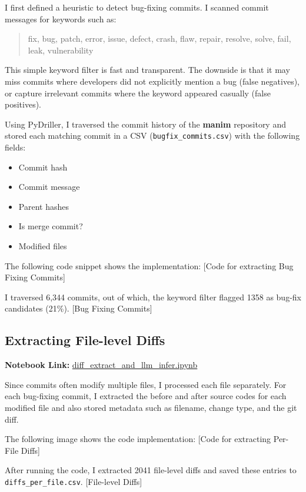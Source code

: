\documentclass[10pt,a4paper]{report}
\begin{document}
I first defined a heuristic to detect bug-fixing commits. I scanned commit messages for keywords such as:
\begin{quote}
fix, bug, patch, error, issue, defect, crash, flaw, repair, resolve, solve, fail, leak, vulnerability
\end{quote}

This simple keyword filter is fast and transparent. The downside is that it may miss commits where developers did not explicitly mention a bug (false negatives), or capture irrelevant commits where the keyword appeared casually (false positives).

Using PyDriller, I traversed the commit history of the \textbf{manim} repository and stored each matching commit in a CSV (\texttt{bugfix\_commits.csv}) with the following fields:
\begin{itemize}[itemsep=0.05em, topsep=0pt]
    \item Commit hash
    \item Commit message
    \item Parent hashes
    \item Is merge commit?
    \item Modified files
\end{itemize}

The following code snippet shows the implementation:
[Code for extracting Bug Fixing Commits]

I traversed 6,344 commits, out of which, the keyword filter flagged 1358 as bug-fix candidates (21\%).
[Bug Fixing Commits]

\subsection{Extracting File-level Diffs}
\textbf{Notebook Link:} \href{https://github.com/ShardulJunagade/cs202-stt/lab2/diff_extract_and_llm_infer.ipynb}{diff\_extract\_and\_llm\_infer.ipynb}

Since commits often modify multiple files, I processed each file separately. For each bug-fixing commit, I extracted the before and after source codes for each modified file and also stored metadata such as filename, change type, and the git diff.

The following image shows the code implementation:
[Code for extracting Per-File Diffs]

After running the code, I extracted 2041 file-level diffs and saved these entries to \texttt{diffs\_per\_file.csv}.
[File-level Diffs]
\end{document}
